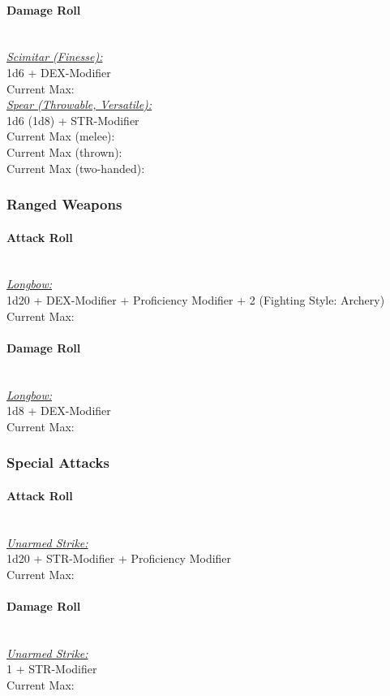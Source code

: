 \documentclass[letterpaper,openany,oneside,twocolumn]{book}
\newcommand{\PATH}{../../}
\begin{document}
\paragraph*{Damage Roll}\hfill\\
\underline{\textit{Scimitar (Finesse):}}\\
1d6 + DEX-Modifier\\
\indent Current Max: 
\\
\underline{\textit{Spear (Throwable, Versatile):}}\\
1d6 (1d8) + STR-Modifier\\
\indent Current Max (melee): \\
\indent Current Max (thrown): \\
\indent Current Max (two-handed): 
\subsubsection*{Ranged Weapons}
\paragraph*{Attack Roll}\hfill\\
\underline{\textit{Longbow:}}\\
1d20 + DEX-Modifier + Proficiency Modifier + 2 (Fighting Style: Archery)\\
\indent Current Max: 
\paragraph*{Damage Roll}\hfill\\
\underline{\textit{Longbow:}}\\
1d8 + DEX-Modifier\\
\indent Current Max: 
\subsubsection*{Special Attacks}
\paragraph*{Attack Roll}\hfill\\
\underline{\textit{Unarmed Strike:}}\\
1d20 + STR-Modifier + Proficiency Modifier\\
\indent Current Max: 
\paragraph*{Damage Roll}\hfill\\
\underline{\textit{Unarmed Strike:}}\\
1 + STR-Modifier\\
\indent Current Max: 


\end{document}

